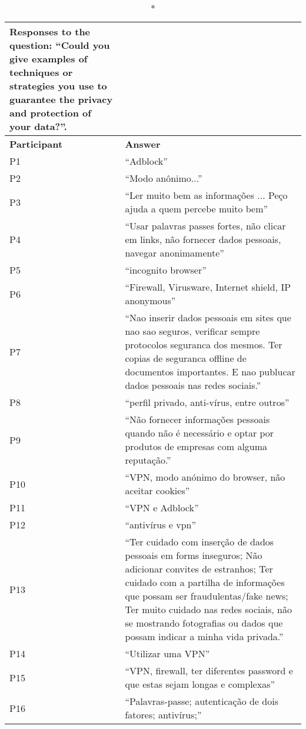 \begin{longtable}{p{3cm} p{13cm}}
    \caption*{Responses to the question: ``Could you give examples of techniques or strategies you use to guarantee the privacy and protection of your data?''.}\label{table:survey_s1_q3}\\
    \hline
    \textbf{Participant} & \textbf{Answer} \\
    \hline
    P1 & ``Adblock'' \\
    \hline
    P2 & ``Modo anônimo...'' \\
    \hline
    P3 & ``Ler muito bem as informações ... Peço ajuda a quem percebe muito bem'' \\
    \hline
    P4 & ``Usar palavras passes fortes, não clicar em links, não fornecer dados pessoais, navegar anonimamente'' \\
    \hline
    P5 & ``incognito browser'' \\
    \hline
    P6 & ``Firewall, Virusware, Internet shield, IP anonymous'' \\
    \hline
    P7 & ``Nao inserir dados pessoais em sites que nao sao seguros, verificar sempre protocolos seguranca dos mesmos. Ter copias de seguranca offline de documentos importantes. E nao publucar dados pessoais nas redes sociais.'' \\
    \hline
    P8 & ``perfil privado, anti-vírus, entre outros'' \\
    \hline
    P9 & ``Não fornecer informações pessoais quando não é necessário e optar por produtos de empresas com alguma reputação.'' \\
    \hline
    P10 & ``VPN, modo anónimo do browser, não aceitar cookies'' \\
    \hline
    P11 & ``VPN e Adblock'' \\
    \hline
    P12 & ``antivírus e vpn'' \\
    \hline
    P13 & ``Ter cuidado com inserção de dados pessoais em forms inseguros; Não adicionar convites de estranhos; Ter cuidado com a partilha de informações que possam ser fraudulentas/fake news; Ter muito cuidado nas redes sociais, não se mostrando fotografias ou dados que possam indicar a minha vida privada.'' \\
    \hline
    P14 & ``Utilizar uma VPN'' \\
    \hline
    P15 & ``VPN, firewall, ter diferentes password e que estas sejam longas e complexas'' \\
    \hline
    P16 & ``Palavras-passe; autenticação de dois fatores; antivírus;'' \\

\end{longtable}
